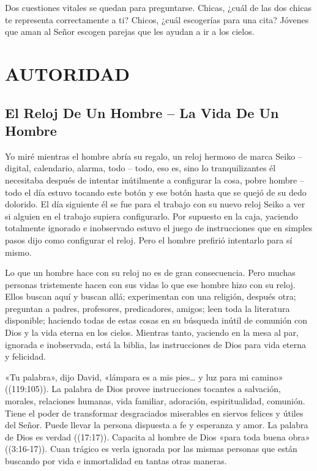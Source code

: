 \documentclass[12pt, twoside, openright]{book}
\begin{document}
Dos cuestiones vitales se quedan para preguntarse. Chicas, ¿cuál de las dos chicas te representa correctamente a ti? Chicos, ¿cuál escogerías para una cita? Jóvenes que aman al Señor escogen parejas que les ayudan a ir a los cielos.

\chapter{AUTORIDAD}

\section{El Reloj De Un Hombre – La Vida De Un Hombre}
Yo miré mientras el hombre abría su regalo, un reloj hermoso de marca Seiko – digital, calendario, alarma, todo – todo, eso es, sino lo tranquilizantes él necesitaba después de intentar inútilmente a configurar la cosa, pobre hombre – todo el día estuvo tocando este botón y ese botón hasta que se quejó de su dedo dolorido. El día siguiente él se fue para el trabajo con su nuevo reloj Seiko a ver si alguien en el trabajo supiera configurarlo. Por supuesto en la caja, yaciendo totalmente ignorado e inobservado estuvo el juego de instrucciones que en simples pasos dijo como configurar el reloj. Pero el hombre prefirió intentarlo para sí mismo.

Lo que un hombre hace con su reloj no es de gran consecuencia. Pero muchas personas tristemente hacen con sus vidas lo que ese hombre hizo con su reloj. Ellos buscan aquí y buscan allá; experimentan con una religión, después otra; preguntan a padres, profesores, predicadores, amigos; leen toda la literatura disponible; haciendo todas de estas cosas en su búsqueda inútil de comunión con Dios y la vida eterna en los cielos. Mientras tanto, yaciendo en la mesa al par, ignorada e inobservada, está la biblia, las instrucciones de Dios para vida eterna y felicidad. 

«Tu palabra», dijo David, «lámpara es a mis pies… y luz para mi camino» ((119:105)). La palabra de Dios provee instrucciones tocantes a salvación, morales, relaciones humanas, vida familiar, adoración, espiritualidad, comunión. Tiene el poder de transformar desgraciados miserables en siervos felices y útiles del Señor. Puede llevar la persona dispuesta a fe y esperanza y amor. La palabra de Dios es verdad ((17:17)). Capacita al hombre de Dios «para toda buena obra» ((3:16-17)). Cuan trágico es verla ignorada por las mismas personas que están buscando por vida e inmortalidad en tantas otras maneras. 
\end{document}
